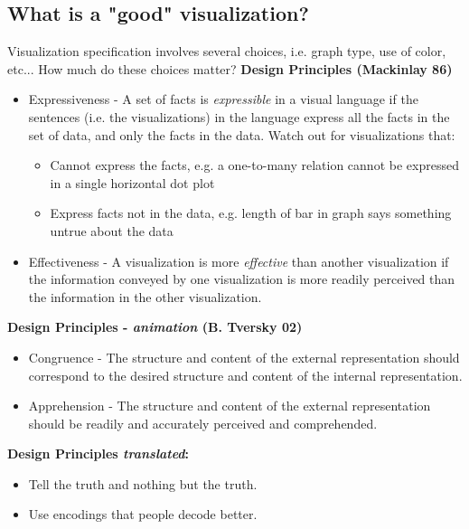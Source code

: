 \subsection{What is a "good" visualization?}
Visualization specification involves several choices, i.e. graph type, use of color, etc... How much do these choices matter?
\newline \newline
\textbf{Design Principles (Mackinlay 86)}
\begin{itemize}
	\item Expressiveness - A set of facts is \emph{expressible} in a visual language if the sentences (i.e. the visualizations) in the language express all the facts in the set of data, and only the facts in the data. Watch out for visualizations that: 
	\begin{itemize}
		\item Cannot express the facts, e.g. a one-to-many relation cannot be expressed in a single horizontal dot plot
		\item Express facts not in the data, e.g. length of bar in graph says something untrue about the data
	\end{itemize}
	\item Effectiveness - A visualization is more \emph{effective} than another visualization if the information conveyed by one visualization is more readily perceived than the information in the other visualization.
\end{itemize}
\textbf{Design Principles - \emph{animation} (B. Tversky 02)}
\begin{itemize}
	\item Congruence - The structure and content of the external representation should correspond to the desired structure and content of the internal representation.
	\item Apprehension - The structure and content of the external representation should be readily and accurately perceived and comprehended.
\end{itemize}
\textbf{Design Principles \emph{translated}:}
\begin{itemize}
	\item Tell the truth and nothing but the truth.
	\item Use encodings that people decode better.
\end{itemize}

